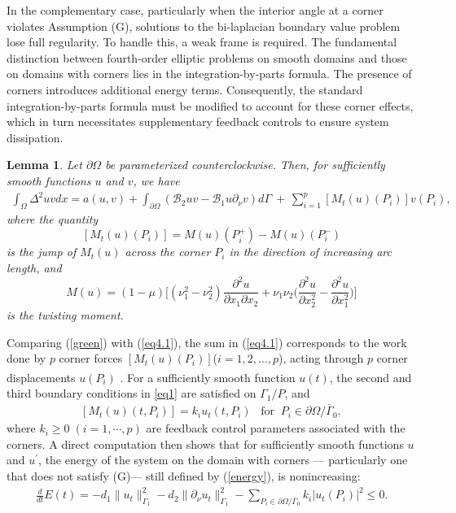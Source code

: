 \documentclass[twoside]{article}
\newtheorem{lemma}[definition]{Lemma}
\theoremstyle{noparens}
\theoremstyle{definition}
\numberwithin{equation}{section}
\numberwithin{figure}{section}
\newcommand{\citeup}[1]{\textsuperscript{\cite{#1}}}
\begin{document}
\medskip

In the complementary case, particularly when the interior angle at a corner violates Assumption (G), solutions to the bi-laplacian boundary value problem lose full regularity. To handle this, a weak frame is required. The fundamental distinction between fourth-order elliptic problems on smooth domains and those on domains with corners lies in the integration-by-parts formula.
The presence of corners introduces additional energy terms. Consequently, the standard integration-by-parts formula must be modified to account for these corner effects, which in turn necessitates supplementary feedback controls to ensure system dissipation.

\medskip

\begin{lemma} \label{lemma-green}
	Let $\partial\Omega$ be
	parameterized   counterclockwise. Then, for sufficiently
	smooth functions $u$ and $v$, we have
	\begin{align}
		\int_{\Omega}\Delta^{2}u v dx   =
		a(u,  v ) + \int_{\partial\Omega} (\mathcal B_{2}u v - \mathcal B_{1}u \partial_{\nu} v )d\Gamma\  + \,\displaystyle\sum\limits_{i=1}^{p}[M_{t}(u)(P_{i})]
		v (P_{i}),
		\label{eq4.1}
	\end{align}
	where the quantity
	$$
	[M_{t}(u)(P_{i})] = M (u)(P_{i}^{+}) - M (u)(P_{i}^{-})
	$$
	is the jump of $M_{t}(u)$ across  the corner $P_{i}$ in the direction of increasing arc length, and
	$$
	M(u) = (1-\mu)\bigg[(\nu_{1}^{2}-\nu_{2}^{2}){\frac{\partial^{2}u}{\partial x_{1}
			\partial x_{2}}}+\nu_{1}\nu_{2}\bigg({\frac{\partial^{2}u}{\partial x_{2}^{2}}}-
	{\frac{\partial^{2}u}{\partial x_{1}^{2}}}\bigg)\bigg]
	$$
	is the twisting moment.
\end{lemma}

\medskip

Comparing (\ref{green}) with (\ref{eq4.1}), the sum in (\ref{eq4.1}) corresponds to the work done by $p$ corner forces $[M_{t}(u)(P_{i})]$($i=1,
2, \ldots, p$), acting through $p$ corner displacements $u(P_{i})$
\citeup{chen1,chen2}.
For a sufficiently smooth function $u(t)$, the second and third boundary conditions in  \eqref{eq1} are satisfied on $\Gamma_1/P$,
and
%
\begin{align}\label{eq4.3}
	[M_{t}(u)(t,P_{i})]   =
	k_i u_t(t,P_{i}) \;\; \; \mbox{for} \;\; P_{i}\in \partial\Omega/ \overline{\Gamma}_{0},
\end{align}
where $k_i \geq 0  \; (i=1,\cdots,p) $ are  feedback control parameters associated with the corners.
%
A direct  computation then shows that for sufficiently smooth functions $u$ and $u^{\prime}$, the energy of the system on the
domain with corners --- particularly one that does not satisfy (G)--- still defined by (\ref{energy}), is
nonincreasing:
%
\begin{align}
	{\frac{d}{dt}}E(t)  =-d_1\|u_{t}\|_{\Gamma_{1}}^{2}
	-d_2\|\partial_{\nu}u_{t}\|_{\Gamma_{1}}^{2}- \sum_{P_i \in \partial\Omega/ \overline{\Gamma}_{0}}k_i |u_t(P_i)|^2 \leq 0.
	\label{eq4.4}
\end{align}
\end{document}
